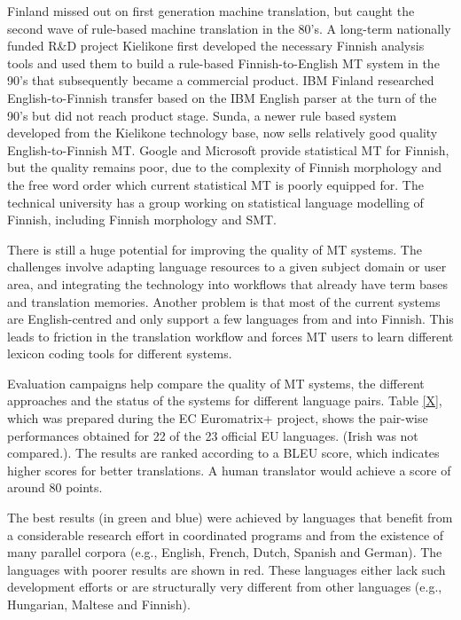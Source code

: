 \documentclass[]{../../metanetpaper}
\begin{document}
\begin{multicols}{2}
Finland missed out on first generation machine translation, but caught the
second wave of rule-based machine translation in the 80’s. A long-term
nationally funded R\&D project Kielikone first developed the necessary Finnish
analysis tools and used them to build a rule-based Finnish-to-English MT system
in the 90’s that subsequently became a commercial product. IBM Finland
researched English-to-Finnish transfer based on the IBM English parser at the
turn of the 90’s but did not reach product stage. Sunda, a newer rule based
system developed from the Kielikone technology base, now sells relatively good
quality English-to-Finnish MT. Google and Microsoft provide statistical MT for
Finnish, but the quality remains poor, due to the complexity of Finnish
morphology and the free word order which current statistical MT is poorly
equipped for. The technical university has a group working on statistical
language modelling of Finnish, including Finnish morphology and SMT.

There is still a huge potential for improving the quality of MT
systems. The challenges involve adapting language resources to a given
subject domain or user area, and integrating the technology into
workflows that already have term bases and translation
memories. Another problem is that most of the current systems are
English-centred and only support a few languages from and into
Finnish. This leads to friction in the translation workflow and forces
MT users to learn different lexicon coding tools for different
systems.

Evaluation campaigns help compare the quality of MT systems, the
different approaches and the status of the systems for different
language pairs. Table \ref{X}, which was prepared during the EC
Euromatrix+ project, shows the pair-wise performances obtained for 22
of the 23 official EU languages. (Irish was not compared.). The
results are ranked according to a BLEU score, which indicates higher
scores for better translations\cite{BLEU}. A human translator would
achieve a score of around 80 points.

The best results (in green and blue) were achieved by languages that
benefit from a considerable research effort in coordinated programs
and from the existence of many parallel corpora (e.g., English,
French, Dutch, Spanish and German). The languages with poorer results
are shown in red. These languages either lack such development efforts
or are structurally very different from other languages (e.g.,
Hungarian, Maltese and Finnish).


\end{multicols}
\end{document}
